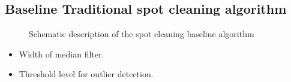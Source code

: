 \documentclass[letterpaper,10pt,english]{sphinxmanual}
\begin{document}
\subsection{Baseline \sphinxhyphen{} Traditional spot cleaning algorithm}
\label{\detokenize{ML4NeutronImageSegmentation:baseline-traditional-spot-cleaning-algorithm}}
\begin{figure}[htbp]
\centering
\capstart

\noindent{}
\caption{Schematic description of the spot cleaning baseline algorithm}\label{\detokenize{ML4NeutronImageSegmentation:id18}}\end{figure}



\begin{itemize}
\item {} 
 Width of median filter.

\item {} 
 Threshold level for outlier detection.

\end{itemize}
\end{document}
